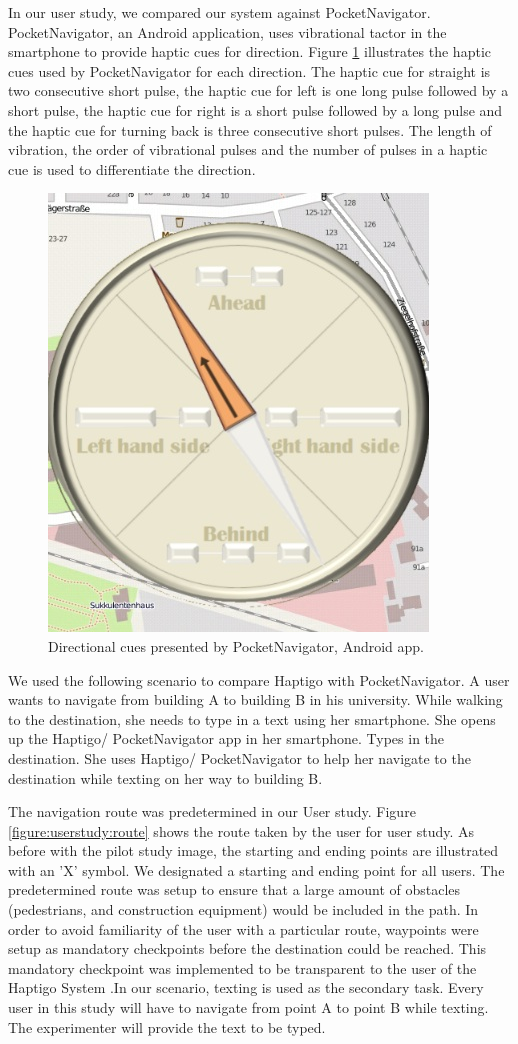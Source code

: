 \documentclass{sigchi}
\begin{document}
In our user study, we compared our system against PocketNavigator\cite{2010_Pielot_MobileHCI}. PocketNavigator\cite{2010_Pielot_MobileHCI}, an Android application, uses vibrational tactor in the smartphone to provide haptic cues for direction. Figure \ref{figure:pocketnavigator} illustrates the haptic cues used by PocketNavigator\cite{2010_Pielot_MobileHCI} for each direction. The haptic cue for straight is two consecutive short pulse, the haptic cue for left is one long pulse followed by a short pulse, the haptic cue for right is a short pulse followed by a long pulse and the haptic cue for turning back is three consecutive short pulses. The length of vibration, the order of vibrational pulses and the number of pulses in a haptic cue is used to differentiate the direction.

\begin{figure}[ht]
\centering
\includegraphics[width=0.5\columnwidth]{Images/PocketNavigator.jpg}
\caption{Directional cues presented by PocketNavigator, Android app.}
\label{figure:pocketnavigator}
\end{figure}

We used the following scenario to compare Haptigo with PocketNavigator\cite{2010_Pielot_MobileHCI}. A user wants to navigate from building A to building B in his university. While walking to the destination, she needs to type in a text using her smartphone. She opens up the Haptigo/ PocketNavigator\cite{2010_Pielot_MobileHCI} app in her smartphone. Types in the destination. She uses Haptigo/ PocketNavigator\cite{2010_Pielot_MobileHCI} to help her navigate to the destination while texting on her way to building B.

The navigation route was predetermined in our User study. Figure \ref{figure:userstudy:route} shows the route taken by the user for user study. As before with the pilot study image, the starting and ending points are illustrated with an 'X' symbol. We designated a starting and ending point for all users. The predetermined route was setup to ensure that a large amount of obstacles (pedestrians, and construction equipment) would be included in the path. In order to avoid familiarity of the user with a particular route, waypoints were setup as mandatory checkpoints before the destination could be reached. This mandatory checkpoint was implemented to be transparent to the user of the Haptigo System .In our scenario, texting is used as the secondary task. Every user in this study will have to navigate from point A to point B while texting. The experimenter will provide the text to be typed.
\end{document}
